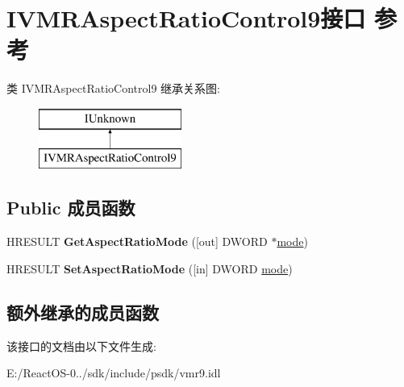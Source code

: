 \hypertarget{interface_i_v_m_r_aspect_ratio_control9}{}\section{I\+V\+M\+R\+Aspect\+Ratio\+Control9接口 参考}
\label{interface_i_v_m_r_aspect_ratio_control9}
类 I\+V\+M\+R\+Aspect\+Ratio\+Control9 继承关系图\+:\begin{figure}[H]
\begin{center}
\leavevmode
\includegraphics[height=2.000000cm]{interface_i_v_m_r_aspect_ratio_control9}
\end{center}
\end{figure}
\subsection*{Public 成员函数}
\begin{DoxyCompactItemize}
\item 
\mbox{\label{interface_i_v_m_r_aspect_ratio_control9_a6619f6e4e739c8edff459344f6a5bd9c}} 
H\+R\+E\+S\+U\+LT {\bfseries Get\+Aspect\+Ratio\+Mode} (\mbox{[}out\mbox{]} D\+W\+O\+RD $\ast$\hyperlink{interfacevoid}{mode})
\item 
\mbox{\label{interface_i_v_m_r_aspect_ratio_control9_af6f0be64fb365d48f1aea534218ebd5b}} 
H\+R\+E\+S\+U\+LT {\bfseries Set\+Aspect\+Ratio\+Mode} (\mbox{[}in\mbox{]} D\+W\+O\+RD \hyperlink{interfacevoid}{mode})
\end{DoxyCompactItemize}
\subsection*{额外继承的成员函数}


该接口的文档由以下文件生成\+:\begin{DoxyCompactItemize}
\item 
E\+:/\+React\+O\+S-\/0../sdk/include/psdk/vmr9.\+idl\end{DoxyCompactItemize}
